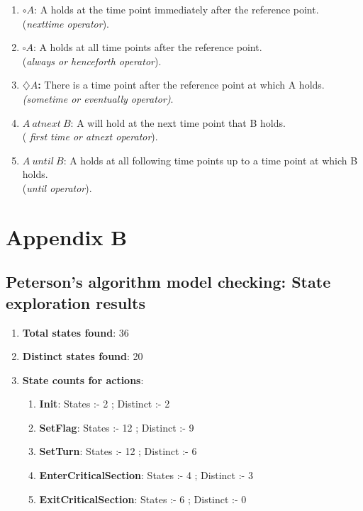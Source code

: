 \documentclass[fleqn]{tukseminar}
\begin{document}
			\begin{enumerate}
				\item \textbf{$\circ A$}: A holds at the time point immediately after the reference point.\\ (\textit{nexttime operator}).
				
				\item \textbf{$\square A$}: A holds at all time points after the reference point.\\ (\textit{always or henceforth operator}).
				
				\item \textbf{$\diamondsuit A$:} There is a time point after the reference point at which A holds. \\\textit{(sometime or eventually operator)}. 
				
				\item \textbf{$A\  atnext\  B$}: A will hold at the next time point that B holds. \\( \textit{first time or atnext operator}).
				
				\item \textbf{$A\  until\  B$}: A holds at all following time points up to a  time point at which B holds. \\(\textit{until operator}).
			\end{enumerate}
		
		
		
		
			\newpage
			\section*{Appendix B}
			\label{app:results}
			\subsection*{Peterson's algorithm model checking: State exploration results}
			\begin{enumerate}
				\item \textbf{Total states found}: 36
				\item \textbf{Distinct states found}: 20
				\item \textbf{State counts for actions}:
				\begin{enumerate}
					\item \textbf{Init}: States :-  2 ; Distinct :- 2
					\item \textbf{SetFlag}: States :-  12 ; Distinct :- 9
					\item \textbf{SetTurn}: States :-  12 ; Distinct :- 6
					\item \textbf{EnterCriticalSection}: States :-  4 ; Distinct :- 3
					\item \textbf{ExitCriticalSection}: States :-  6 ; Distinct :- 0
				\end{enumerate}
			\end{enumerate}
			
\end{document}
